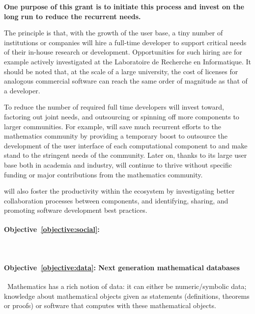 \documentclass[noworkareas,deliverables,keys]{euproposal}                  %
\begin{document}
\begin{proposal}
\textbf{One purpose of this grant is to initiate this process and
  invest on the long run to reduce the recurrent needs.}

The principle is that, with the growth of the user base, a tiny number
of institutions or companies will hire a full-time developer to
support critical needs of their in-house research or development.
Opportunities for such hiring are for example actively investigated at
the Laboratoire de Recherche en Informatique. It should be noted that,
at the scale of a large university, the cost of licenses for analogous
commercial software can reach the same order of magnitude as that of a
developer.


To reduce the number of required full time developers \TheProject will
invest toward, factoring out joint needs, and outsourcing or spinning
off more components to larger communities.
%
For example, \TheProject will save much recurrent efforts to the
mathematics community by providing a temporary boost to outsource the
development of the user interface of each computational component to
\IPython and make \IPython stand to the stringent needs of the
community.  Later on, thanks to its large user base both in academia
and industry, \IPython will continue to thrive without specific
funding or major contributions from the mathematics community.

\TheProject will also foster the productivity within the ecosystem by
investigating better collaboration processes between components, and
identifying, sharing, and promoting software development best
practices.

\paragraph{Objective~\ref{objective:social}: }\ 

\paragraph{Objective~\ref{objective:data}: Next generation mathematical databases}\ 
Mathematics has a rich notion of data: it can either be numeric/symbolic data; knowledge about mathematical objects given as statements (definitions, theorems or proofs) or software that computes with these mathematical objects. 


\end{proposal}
\end{document}
